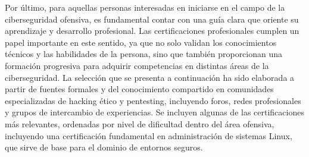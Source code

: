 \documentclass[a4paper, 11pt]{article}
\begin{document}
Por último, para aquellas personas interesadas en iniciarse en el campo de la ciberseguridad ofensiva, 
es fundamental contar con una guía clara que oriente su aprendizaje y desarrollo profesional. Las certificaciones 
profesionales cumplen un papel importante en este sentido, ya que no solo validan los conocimientos técnicos y las habilidades de la persona, sino que también proporcionan una formación progresiva para adquirir competencias en distintas áreas de la ciberseguridad. La selección que se presenta a continuación ha sido elaborada a partir de fuentes formales y del conocimiento compartido en comunidades especializadas de hacking ético y pentesting, incluyendo foros, redes profesionales y grupos de intercambio de experiencias. Se incluyen algunas de las certificaciones más relevantes, ordenadas por nivel de dificultad dentro del área ofensiva, incluyendo una certificación fundamental en administración de sistemas Linux, que sirve de base para el dominio de entornos seguros.
\end{document}

